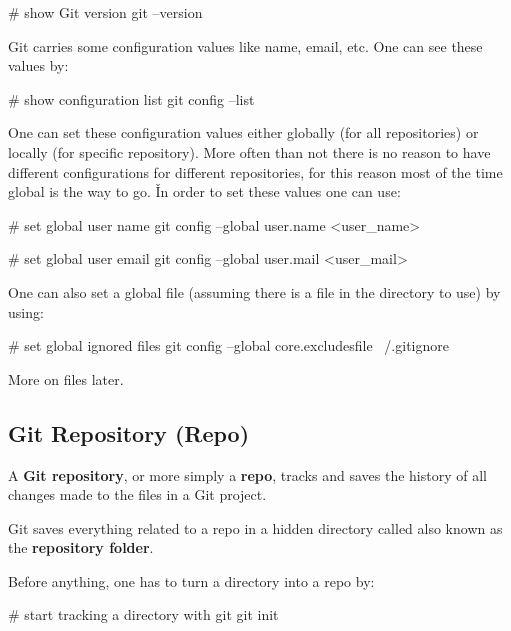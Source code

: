 \begin{bash}
# show Git version
git --version
\end{bash}

Git carries some configuration values like name, email, etc. One can see these values by:

\begin{bash}
# show configuration list
git config --list
\end{bash}

One can set these configuration values either globally (for all repositories) or locally (for specific repository).
More often than not there is no reason to have different configurations for different repositories, for this reason
most of the time global is the way to go. \v

In order to set these values one can use:

\begin{bash}
# set global user name
git config --global user.name <user_name>
\end{bash}

\begin{bash}
# set global user email
git config --global user.mail <user_mail>
\end{bash}

One can also set a global  file (assuming there is a  file in the directory to use)
by using:

\begin{bash}
# set global ignored files
git config --global core.excludesfile ~/.gitignore
\end{bash}

More on  files later.

\subsection{Git Repository (Repo)}

A \textbf{Git repository}, or more simply a \textbf{repo}, tracks and saves the history of all changes made to the
files in a Git project.
\ed

Git saves everything related to a repo in a hidden directory called  also known as the \textbf{repository
folder}.
\ed

Before anything, one has to turn a directory into a repo by:

\begin{bash}
# start tracking a directory with git
git init
\end{bash}

